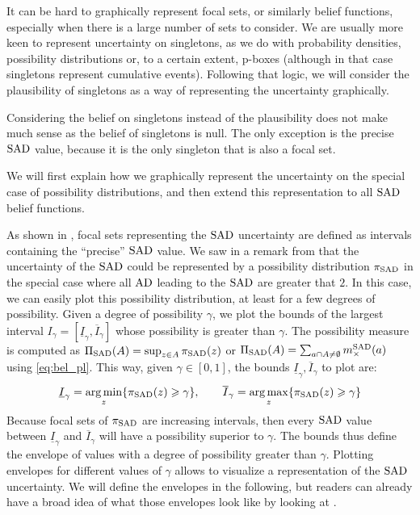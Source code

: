 It can be hard to graphically represent focal sets, or similarly belief functions, especially when there is a large number of sets to consider. We are usually more keen to represent uncertainty on singletons, as we do with probability densities, possibility distributions or, to a certain extent, p-boxes (although in that case singletons represent cumulative events). Following that logic, we will consider the plausibility of singletons as a way of representing the uncertainty graphically.
\begin{remark}
    Considering the belief on singletons instead of the plausibility does not make much sense as the belief of singletons is null. The only exception is the precise $\mathrm{SAD}$ value, because it is the only singleton that is also a focal set.
\end{remark}
We will first explain how we  graphically represent the uncertainty on the special case of possibility distributions, and then extend this representation to all $\mathrm{SAD}$ belief functions. 

As shown in , focal sets representing the $\mathrm{SAD}$ uncertainty are defined as intervals containing the ``precise'' $\mathrm{SAD}$ value. We saw in a remark from  that the uncertainty of the $\mathrm{SAD}$ could be represented by a possibility distribution $\pi_{\mathrm{SAD}}$ in the special case where all $\mathrm{AD}$ leading to the $\mathrm{SAD}$ are greater that $2$. In this case, we can easily plot this possibility distribution, at least for a few degrees of possibility. Given a degree of possibility $\gamma$, we plot the bounds of the largest interval $I_\gamma=[\underline{I}_\gamma, \overline{I}_\gamma]$ whose possibility is greater than $\gamma$. The possibility measure is computed as $\Pi_{\mathrm{SAD}}(A)=\sup_{z\in A}\pi_{\mathrm{SAD}}(z)$ or $\Pi_{\mathrm{SAD}}(A)=\sum_{a\cap A\neq\emptyset}m^{\mathrm{SAD}}_\times(a)$ using \cref{eq:bel_pl}. This way, given $\gamma\in[0,1]$, the bounds $\underline{I}_\gamma, \overline{I}_\gamma$ to plot are:
\begin{align}\label{eq:possibility_bounds}
    \underline{I}_\gamma = \operatorname*{arg\,min}_{z}\{\pi_{\mathrm{SAD}}(z)\geqslant\gamma\}, \qquad \overline{I}_\gamma = \operatorname*{arg\,max}_{z}\{\pi_{\mathrm{SAD}}(z)\geqslant\gamma\}
\end{align}
Because focal sets of $\pi_{\mathrm{SAD}}$ are increasing intervals, then every $\mathrm{SAD}$ value between $\underline{I}_\gamma$ and $\overline{I}_\gamma$ will have a possibility superior to $\gamma$. The bounds thus define the envelope of values with a degree of possibility greater than $\gamma$. Plotting envelopes for different values of $\gamma$ allows to visualize a representation of the $\mathrm{SAD}$ uncertainty. We will define the envelopes in the following, but readers can already have a broad idea of what those envelopes look like by looking at . 

